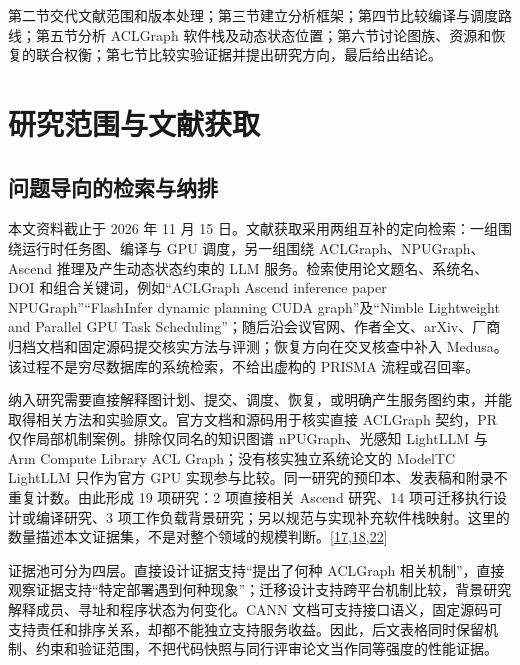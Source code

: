 \documentclass[
  UTF8,
  zihao=5]{ctexart}
\begin{document}
第二节交代文献范围和版本处理；第三节建立分析框架；第四节比较编译与调度路线；第五节分析
ACLGraph
软件栈及动态状态位置；第六节讨论图族、资源和恢复的联合权衡；第七节比较实验证据并提出研究方向，最后给出结论。

\hypertarget{ux7814ux7a76ux8303ux56f4ux4e0eux6587ux732eux83b7ux53d6}{%
\section{研究范围与文献获取}\label{ux7814ux7a76ux8303ux56f4ux4e0eux6587ux732eux83b7ux53d6}}

\hypertarget{ux95eeux9898ux5bfcux5411ux7684ux68c0ux7d22ux4e0eux7eb3ux6392}{%
\subsection{问题导向的检索与纳排}\label{ux95eeux9898ux5bfcux5411ux7684ux68c0ux7d22ux4e0eux7eb3ux6392}}

本文资料截止于 2026 年 11 月 15
日。文献获取采用两组互补的定向检索：一组围绕运行时任务图、编译与 GPU
调度，另一组围绕 ACLGraph、NPUGraph、Ascend 推理及产生动态状态约束的 LLM
服务。检索使用论文题名、系统名、DOI 和组合关键词，例如``ACLGraph Ascend
inference paper NPUGraph''``FlashInfer dynamic planning CUDA
graph''及``Nimble Lightweight and Parallel GPU Task
Scheduling''；随后沿会议官网、作者全文、arXiv、厂商归档文档和固定源码提交核实方法与评测；恢复方向在交叉核查中补入
Medusa。该过程不是穷尽数据库的系统检索，不给出虚构的 PRISMA
流程或召回率。

纳入研究需要直接解释图计划、提交、调度、恢复，或明确产生服务图约束，并能取得相关方法和实验原文。官方文档和源码用于核实直接
ACLGraph 契约，PR 仅作局部机制案例。排除仅同名的知识图谱
nPUGraph、光感知 LightLLM 与 Arm Compute Library ACL
Graph；没有核实独立系统论文的 ModelTC LightLLM 只作为官方 GPU
实现参与比较。同一研究的预印本、发表稿和附录不重复计数。由此形成 19
项研究：2 项直接相关 Ascend 研究、14 项可迁移执行设计或编译研究、3
项工作负载背景研究；另以规范与实现补充软件栈映射。这里的数量描述本文证据集，不是对整个领域的规模判断。{[}\protect\hyperlink{ref-liu2025xllm}{17},\protect\hyperlink{ref-yu2026ascendfield}{18},\protect\hyperlink{ref-lightllm2026code}{22}{]}

证据池可分为四层。直接设计证据支持``提出了何种 ACLGraph
相关机制''，直接观察证据支持``特定部署遇到何种现象''；迁移设计支持跨平台机制比较，背景研究解释成员、寻址和程序状态为何变化。CANN
文档可支持接口语义，固定源码可支持责任和排序关系，却都不能独立支持服务收益。因此，后文表格同时保留机制、约束和验证范围，不把代码快照与同行评审论文当作同等强度的性能证据。
\end{document}

